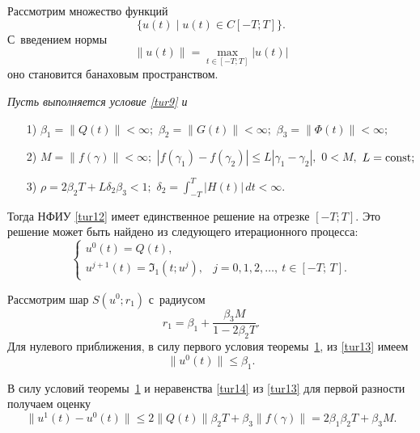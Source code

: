 \smallskip


Рассмотрим множество функций 
$$ \bigl\{ u (t) \mid u (t)  \in C [-T ;  T] \bigr\}.$$
С~введением нормы 
$$
\bigl\| u (t) \bigr\|=\max_{t \in [-T ;  T]}  \bigl| u (t) \bigr|
$$
оно становится банаховым пространством.


\smallskip

\hypertarget{yuld:th1}{}

\begin{theorem}[1]\it Пусть выполняется условие \eqref{tur9} и 
\begin{itemize}
\item[\rm 1)] $\beta_{ 1}= \| Q (t) \| <\infty;$
$\beta_{ 2}= \| G (t) \| <\infty;$
$\beta_{ 3}= \| \Phi (t) \| <\infty;$

\item[\rm 2)] $M= \| f (\gamma) \| <\infty;$
$| f (\gamma_1)-f (\gamma_2) | \le L | \gamma_1-\gamma_2 | ,$ $ 0<M ,$ $ L=\rm const ;$

\item[\rm 3)] $\rho=2  \beta_{ 2}  T+L  \delta_{ 2}  \beta_{ 3} <1;$ 
$\displaystyle \delta_{ 2}=  \int _{-T}^T  | H (t) | \, d t <\infty .$
\end{itemize}
Тогда НФИУ \eqref{tur12} имеет единственное решение на отрезке  $[-T ;  T].$ Это решение может быть найдено из следующего итерационного процесса{\/\rm:}
\begin {equation}
\label{tur13}
\begin{cases} 
u^{ 0} (t) =Q (t) , & \\
u^{ j+1} (t) =\Im_{ 1} (t;  u^{ j}), & j=0 , 1 , 2 , \ldots , \: t \in [-T ; \, T]. 
\end{cases}
\end{equation} 
\end{theorem}

\smallskip
	
\proof Рассмотрим шар $S ( u^{ 0} ; r_1 )$ с~радиусом 
$$r_1=\beta_1+\dfrac{\beta_3  M}{1-2  \beta_2  T}.$$ 
Для нулевого приближения, в силу первого условия теоремы~\hyperlink{yuld:th1}{1}, из  \eqref{tur13} имеем 
\begin {equation}
\label{tur14}
\| u^{ 0} (t) \| \le \beta_{1} .	
\end{equation}

В силу условий теоремы~\hyperlink{yuld:th1}{1} и неравенства \eqref{tur14} из \eqref{tur13} для первой разности получаем оценку 
\begin{equation}
\| u^{ 1} (t)-u^{ 0} (t) \| \le 2  
\| Q (t) \| \beta_2  T+
\beta_{ 3}  \| f (\gamma) \|=2  \beta_1  \beta_2  T+\beta_3  M .
\label{tur15}
\end{equation}

